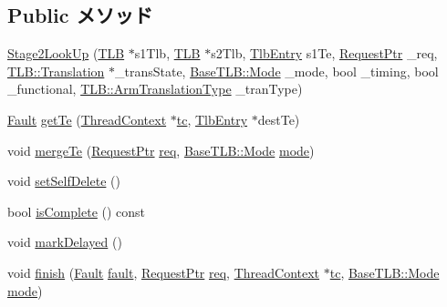 \subsection*{Public メソッド}
\begin{DoxyCompactItemize}
\item 
\hyperlink{classArmISA_1_1Stage2LookUp_abcff27c38575e65477d6f0e57184f0a5}{Stage2LookUp} (\hyperlink{classArmISA_1_1TLB}{TLB} $\ast$s1Tlb, \hyperlink{classArmISA_1_1TLB}{TLB} $\ast$s2Tlb, \hyperlink{structArmISA_1_1TlbEntry}{TlbEntry} s1Te, \hyperlink{classRequest}{RequestPtr} \_\-req, \hyperlink{classBaseTLB_1_1Translation}{TLB::Translation} $\ast$\_\-transState, \hyperlink{classBaseTLB_a46c8a310cf4c094f8c80e1cb8dc1f911}{BaseTLB::Mode} \_\-mode, bool \_\-timing, bool \_\-functional, \hyperlink{classArmISA_1_1TLB_ad6f5d480df151d5bddeefc6271793f08}{TLB::ArmTranslationType} \_\-tranType)
\item 
\hyperlink{classRefCountingPtr}{Fault} \hyperlink{classArmISA_1_1Stage2LookUp_acc13008b8a9b54bb9ce96f72a86078cd}{getTe} (\hyperlink{classThreadContext}{ThreadContext} $\ast$\hyperlink{namespaceArmISA_a5aff829af55e65b802d83dfcef4e9dd0}{tc}, \hyperlink{structArmISA_1_1TlbEntry}{TlbEntry} $\ast$destTe)
\item 
void \hyperlink{classArmISA_1_1Stage2LookUp_a4cf48b3e3f9013b0ede4079a49d7591c}{mergeTe} (\hyperlink{classRequest}{RequestPtr} \hyperlink{classArmISA_1_1Stage2LookUp_a76fdf11ae9d2e0af47b6362edcc4aaef}{req}, \hyperlink{classBaseTLB_a46c8a310cf4c094f8c80e1cb8dc1f911}{BaseTLB::Mode} \hyperlink{classArmISA_1_1Stage2LookUp_ae9b5adf8be89a72128708c7e621e7211}{mode})
\item 
void \hyperlink{classArmISA_1_1Stage2LookUp_afc49b5786125a229938153fa655c23f1}{setSelfDelete} ()
\item 
bool \hyperlink{classArmISA_1_1Stage2LookUp_a8f31086c831baedbaa74038c8434fb7f}{isComplete} () const 
\item 
void \hyperlink{classArmISA_1_1Stage2LookUp_ad1fd11d1e352cfc4b329d29b46a19fc4}{markDelayed} ()
\item 
void \hyperlink{classArmISA_1_1Stage2LookUp_a01e7d945def8d2e5df87a169954fa89f}{finish} (\hyperlink{classRefCountingPtr}{Fault} \hyperlink{classArmISA_1_1Stage2LookUp_a68714ceb74c60ea7ef5dec335bb6c5d7}{fault}, \hyperlink{classRequest}{RequestPtr} \hyperlink{classArmISA_1_1Stage2LookUp_a76fdf11ae9d2e0af47b6362edcc4aaef}{req}, \hyperlink{classThreadContext}{ThreadContext} $\ast$\hyperlink{namespaceArmISA_a5aff829af55e65b802d83dfcef4e9dd0}{tc}, \hyperlink{classBaseTLB_a46c8a310cf4c094f8c80e1cb8dc1f911}{BaseTLB::Mode} \hyperlink{classArmISA_1_1Stage2LookUp_ae9b5adf8be89a72128708c7e621e7211}{mode})
\end{DoxyCompactItemize}
